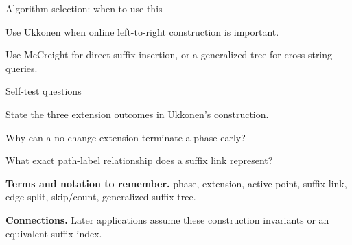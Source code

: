 \documentclass[11pt,letterpaper]{article}
\begin{document}
\begin{CornellOverviewBox}{Algorithm selection: when to use this}
\begin{CornellChecklist}
  \item Use Ukkonen when online left-to-right construction is important.
  \item Use McCreight for direct suffix insertion, or a generalized tree for cross-string queries.
\end{CornellChecklist}
\end{CornellOverviewBox}

\begin{CornellExamBox}{Self-test questions}
\begin{CornellRecallList}
  \item State the three extension outcomes in Ukkonen's construction.
  \item Why can a no-change extension terminate a phase early?
  \item What exact path-label relationship does a suffix link represent?
\end{CornellRecallList}
\end{CornellExamBox}

{\footnotesize
\textbf{Terms and notation to remember.} phase, extension, active point, suffix link, edge split, skip/count, generalized suffix tree.

\textbf{Connections.} Later applications assume these construction invariants or an equivalent suffix index.
}
\end{document}
